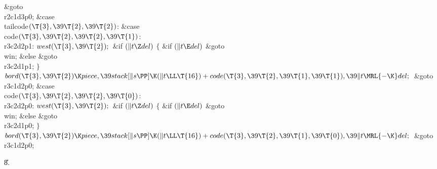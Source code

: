 \&{goto} \\{r2c1d3p0};\6
\4\&{case} \\{tailcode}${}(\T{3},\39\T{2},\39\T{2}){}$:\5
\&{case} \\{code}${}(\T{3},\39\T{2},\39\T{2},\39\T{1}){}$:\5
\\{r3c2d2p1}:\5
${}\\{west}(\T{3},\39\T{2});{}$\6
\&{if} ${}(\|t\Z\\{del}){}$\5
${}\{{}$\5
\1\&{if} ${}(\|t\E\\{del}){}$\1\5
\&{goto} \\{win};\5
\2\&{else}\1\5
\&{goto} \\{r3c2d1p1};\5
\2${}\}{}$\2\6
${}\\{bord}(\T{3},\39\T{2})\K\\{piece},\39\\{stack}[\|s\PP]\K(\|t\LL\T{16})+%
\\{code}(\T{3},\39\T{2},\39\T{1},\39\T{1}),\39\|t\MRL{-{\K}}\\{del};{}$\6
\&{goto} \\{r3c1d2p0};\6
\4\&{case} \\{code}${}(\T{3},\39\T{2},\39\T{2},\39\T{0}){}$:\5
\\{r3c2d2p0}:\5
${}\\{west}(\T{3},\39\T{2});{}$\6
\&{if} ${}(\|t\Z\\{del}){}$\5
${}\{{}$\5
\1\&{if} ${}(\|t\E\\{del}){}$\1\5
\&{goto} \\{win};\5
\2\&{else}\1\5
\&{goto} \\{r3c2d1p0};\5
\2${}\}{}$\2\6
${}\\{bord}(\T{3},\39\T{2})\K\\{piece},\39\\{stack}[\|s\PP]\K(\|t\LL\T{16})+%
\\{code}(\T{3},\39\T{2},\39\T{1},\39\T{0}),\39\|t\MRL{-{\K}}\\{del};{}$\6
\&{goto} \\{r3c1d2p0};\par
\U8.\fi

